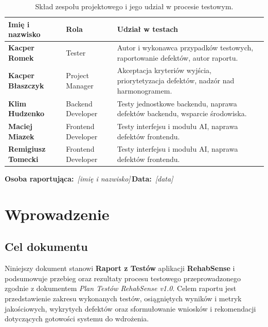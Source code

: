 \documentclass[11pt,a4paper]{article}
\newcommand{\sysname}{\textbf{RehabSense}}
\newcommand{\luka}[1]{\colorbox{lukacol}{\,\textit{[#1]}\,}}
\begin{document}
\begin{table}[h]
\centering
\begin{tabularx}{\textwidth}{>{\bfseries}p{4cm} p{3.5cm} Y}
\toprule
\textbf{Imię i nazwisko} & \textbf{Rola} & \textbf{Udział w testach} \\
\midrule
Kacper Romek & Tester & Autor i wykonawca przypadków testowych, raportowanie defektów, autor raportu. \\
Kacper Błaszczyk & Project Manager & Akceptacja kryteriów wyjścia, priorytetyzacja defektów, nadzór nad harmonogramem. \\
Klim Hudzenko & Backend Developer & Testy jednostkowe backendu, naprawa defektów backendu, wsparcie środowiska. \\
Maciej Miazek & Frontend Developer & Testy interfejsu i modułu AI, naprawa defektów frontendu. \\
Remigiusz Tomecki & Frontend Developer & Testy interfejsu i modułu AI, naprawa defektów frontendu. \\
\bottomrule
\end{tabularx}
\caption{Skład zespołu projektowego i jego udział w procesie testowym.}
\end{table}

\vspace{0.5cm}
\noindent\textbf{Osoba raportująca:} \luka{imię i nazwisko}\quad\textbf{Data:} \luka{data}

\newpage

\tableofcontents
\newpage

\section{Wprowadzenie}

\subsection{Cel dokumentu}
Niniejszy dokument stanowi \textbf{Raport z Testów} aplikacji \sysname{} i podsumowuje przebieg oraz rezultaty procesu testowego przeprowadzonego zgodnie z dokumentem \textit{Plan Testów RehabSense v1.0}. Celem raportu jest przedstawienie zakresu wykonanych testów, osiągniętych wyników i metryk jakościowych, wykrytych defektów oraz sformułowanie wniosków i rekomendacji dotyczących gotowości systemu do wdrożenia.
\end{document}
